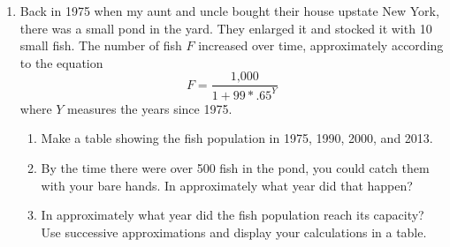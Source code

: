 \begin{enumerate}
\newpage %

\item Back in 1975 when my aunt and uncle bought their house upstate New York, there was a small pond in the yard.  They enlarged it and stocked it with 10 small fish. The number of fish $F$ increased over time, approximately according to the equation
$$ F=\frac{\text{1,000}}{1+99 \ast .65^Y}$$
where $Y$ measures the years since 1975.

\begin{enumerate}
\item Make a table showing the fish population in 1975, 1990, 2000, and 2013. \vfill
\item By the time there were over 500 fish in the pond, you could catch them with your bare hands.  In approximately what year did that happen? \vfill
\item In approximately what year did the fish population reach its capacity?  Use successive approximations and display your calculations in a table. \vfill

\end{enumerate}

%

\newpage %


\end{enumerate}
